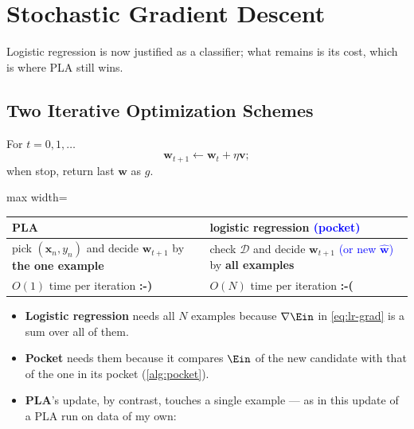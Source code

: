 \section{Stochastic Gradient Descent}\label{sec:sgd}


Logistic regression is now justified as a classifier; what remains is its
cost, which is where PLA still wins.

\subsection{Two Iterative Optimization Schemes}

For \(t = 0, 1, \dots\)
\[
    \bm{w}_{t+1} \gets \bm{w}_t + \eta \bm{v} ;
\]
when stop, return last \(\bm{w}\) as \(g\).

\begin{center}
    \begin{adjustbox}{max width=\textwidth}
        \solidrules
        \begin{tabular}{@{}>{\raggedright\arraybackslash}p{6cm}|>{\raggedright\arraybackslash}p{6cm}@{}}
            \toprule
            \textbf{PLA} & \textbf{logistic regression
            \textcolor{blue}{(pocket)}}\\
            \midrule
            pick \((\bm{x}_n, y_n)\) and decide \(\bm{w}_{t+1}\) by
            \textcolor{orange!85!black}{\textbf{the one example}}
            & check \(\mathcal{D}\) and decide \(\bm{w}_{t+1}\)
            \textcolor{blue}{(or new \(\hat{\bm{w}}\))} by
            \textcolor{orange!85!black}{\textbf{all examples}}\\[2pt]
            \qquad \(O(1)\) time per iteration
            \textcolor{orange!85!black}{\textbf{:-)}}
            & \qquad \(O(N)\) time per iteration
            \textcolor{orange!85!black}{\textbf{:-(}}\\
            \bottomrule
        \end{tabular}
    \end{adjustbox}
\end{center}

\begin{itemize}
    \item \textbf{Logistic regression} needs all \(N\) examples because
        \(\nabla \Ein\) in \eqref{eq:lr-grad} is a sum over all of them.
    \item \textbf{Pocket} needs them because it compares \(\Ein\) of the new
        candidate with that of the one in its pocket (\autoref{alg:pocket}).
    \item \textbf{PLA}'s update, by contrast, touches a single example --- as in
        this update of a PLA run on data of my own:
\end{itemize}

